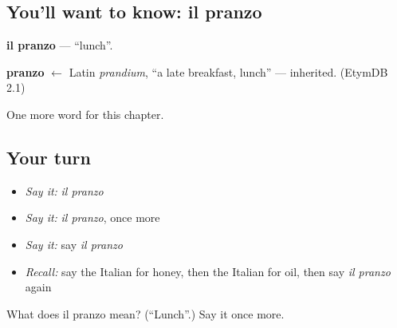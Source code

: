 \subsection*{You'll want to know: il pranzo}
\textbf{il pranzo} — \textquotedblleft{}lunch\textquotedblright{}.

\begin{cousinweb}
\textbf{pranzo} $\leftarrow$ Latin \emph{prandium}, \textquotedblleft{}a late breakfast, lunch\textquotedblright{} — inherited. (EtymDB 2.1)
\end{cousinweb}

\begin{grammarlens}[title={What you've built}]
One more word for this chapter.
\end{grammarlens}

\subsection*{Your turn}
\begin{itemize}
\raggedright
  \item \emph{Say it:} \emph{il pranzo}
  \item \emph{Say it:} \emph{il pranzo}, once more
  \item \emph{Say it:} say \emph{il pranzo}
  \item \emph{Recall:} say the Italian for honey, then the Italian for oil, then say \emph{il pranzo} again
\end{itemize}

\begin{tcolorbox}[breakable,colback=teal!4,colframe=teal!35!black,title={Before you move on}]
What does il pranzo mean? (\textquotedblleft{}Lunch\textquotedblright{}.) Say it once more.
\end{tcolorbox}
